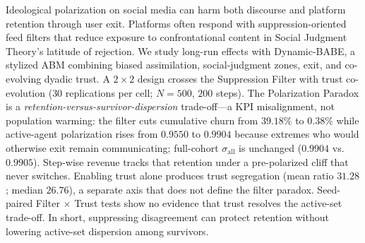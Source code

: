 Ideological polarization on social media can harm both discourse and platform retention through user exit. Platforms often respond with suppression-oriented feed filters that reduce exposure to confrontational content in Social Judgment Theory's latitude of rejection. We study long-run effects with Dynamic-BABE, a stylized ABM combining biased assimilation, social-judgment zones, exit, and co-evolving dyadic trust. A $2\times2$ design crosses the Suppression Filter with trust co-evolution ($30$ replications per cell; $N=500$, $200$ steps). The Polarization Paradox is a \emph{retention-versus-survivor-dispersion} trade-off---a KPI misalignment, not population warming: the filter cuts cumulative churn from $39.18\%$ to $0.38\%$ while active-agent polarization rises from $0.9550$ to $0.9904$ because extremes who would otherwise exit remain communicating; full-cohort $\sigma_{\mathrm{all}}$ is unchanged ($0.9904$ vs.\ $0.9905$). Step-wise revenue tracks that retention under a pre-polarized cliff that never switches. Enabling trust alone produces trust segregation (mean ratio $31.28$; median $26.76$), a separate axis that does not define the filter paradox. Seed-paired Filter $\times$ Trust tests show no evidence that trust resolves the active-set trade-off. In short, suppressing disagreement can protect retention without lowering active-set dispersion among survivors.

